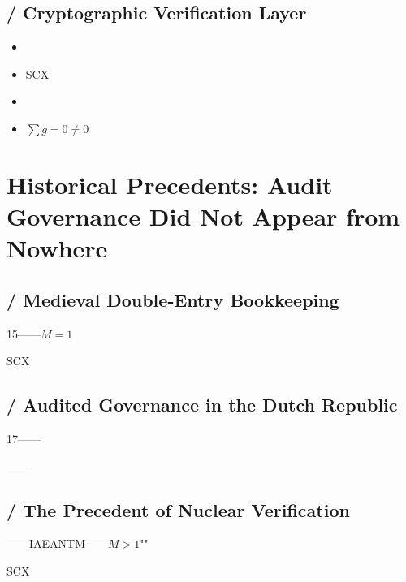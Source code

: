 \documentclass[12pt,a4paper]{article}
\theoremstyle{remark}
\begin{document}
\textbf{}

\subsection{ / Cryptographic Verification Layer}



\begin{itemize}[nosep]
    \item 
    \item SCX
    \item 
    \item $\sum g = 0$$\neq 0$
\end{itemize}


\section{}
\section{Historical Precedents: Audit Governance Did Not Appear from Nowhere}

\subsection{ / Medieval Double-Entry Bookkeeping}

15——$M=1$

SCX

\subsection{ / Audited Governance in the Dutch Republic}

17\textbf{}——

\textbf{}——

\subsection{ / The Precedent of Nuclear Verification}

——IAEANTM——$M>1$""\textbf{}

SCX\textbf{}

\end{document}

